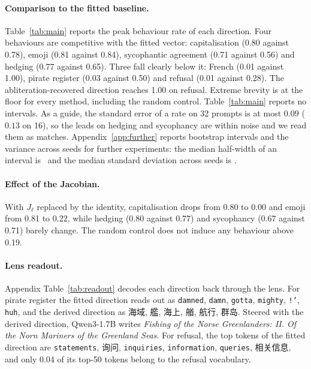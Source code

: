 \documentclass{article}
\newcommand{\zh}[1]{{\zhfont #1}}
\begin{document}
\paragraph{Comparison to the fitted baseline.}
Table~\ref{tab:main} reports the peak behaviour rate of each direction. Four behaviours are competitive with the fitted vector: capitalisation (0.80 against 0.78), emoji (0.81 against 0.84), sycophantic agreement (0.71 against 0.56) and hedging (0.77 against 0.65). Three fall clearly below it: French (0.01 against 1.00), pirate register (0.03 against 0.50) and refusal (0.01 against 0.28). The abliteration-recovered direction reaches 1.00 on refusal. Extreme brevity is at the floor for every method, including the random control. Table~\ref{tab:main} reports no intervals. As a guide, the standard error of a rate on 32 prompts is at most $0.09$ ($0.13$ on 16), so the leads on hedging and sycophancy are within noise and we read them as matches. Appendix~\ref{app:further} reports bootstrap intervals and the variance across seeds for further experiments: the median half-width of an interval is \FCIHalfMedian\ and the median standard deviation across seeds is \FSeedSDMedian.

\paragraph{Effect of the Jacobian.}
With $J_\ell$ replaced by the identity, capitalisation drops from 0.80 to 0.00 and emoji from 0.81 to 0.22, while hedging (0.80 against 0.77) and sycophancy (0.67 against 0.71) barely change. The random control does not induce any behaviour above 0.19.

\paragraph{Lens readout.}
Appendix Table~\ref{tab:readout} decodes each direction back through the lens. For pirate register the fitted direction reads out as \texttt{damned}, \texttt{damn}, \texttt{gotta}, \texttt{mighty}, \texttt{!'}, \texttt{huh}, and the derived direction as \zh{海域}, \zh{艦}, \zh{海上}, \zh{艏}, \zh{航行}, \zh{群岛}. Steered with the derived direction, Qwen3-1.7B writes \emph{Fishing of the Norse Greenlanders: II. Of the Norn Mariners of the Greenland Seas}. For refusal, the top tokens of the fitted direction are \texttt{statements}, \zh{询问}, \texttt{inquiries}, \texttt{information}, \texttt{queries}, \zh{相关信息}, and only 0.04 of its top-50 tokens belong to the refusal vocabulary.
\end{document}
